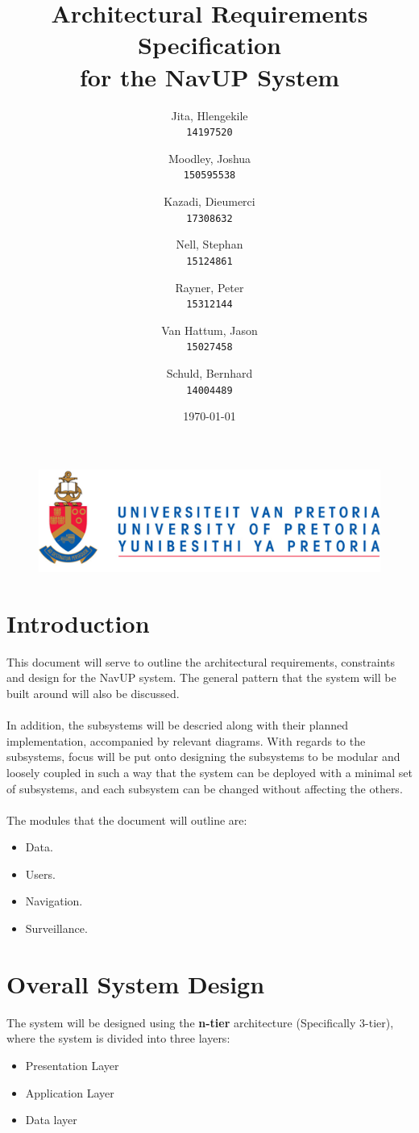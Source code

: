\documentclass[english]{article}
\author{
	Jita, Hlengekile\\
	\texttt{14197520}
	\and
	Moodley, Joshua\\
	\texttt{150595538}
	\and
	Kazadi, Dieumerci\\
	\texttt{17308632}
	\and
	Nell, Stephan\\
	\texttt{15124861}
	\and
	Rayner, Peter\\
	\texttt{15312144}
	\and
	Van Hattum, Jason\\
	\texttt{15027458}
	\and
	Schuld, Bernhard\\
	\texttt{14004489}
}
\title{Architectural Requirements Specification\\
	for the NavUP System\\
	}
\date{\today}
\begin{document}
    \fboxsep=2mm

	\maketitle
	\begin{figure}[!t]
		\includegraphics{up_logo.png}
	\end{figure}
	\newpage

	\tableofcontents
	\newpage

	

	\section{Introduction}

		This document will serve to outline the architectural requirements, constraints and design for the NavUP system. The general pattern that the system will be built around will also be discussed.\\
        \\
		In addition, the subsystems will be descried along with their planned implementation, accompanied by relevant diagrams. With regards to the subsystems, focus will be put onto designing the subsystems to be modular and loosely coupled in such a way that the system can be deployed with a minimal set of subsystems, and each subsystem can be changed without affecting the others.\\
		\\		
		The modules that the document will outline are:
		\begin{itemize}
		    \item Data.
		    \item Users.
		    \item Navigation.
		    \item Surveillance.
		\end{itemize}
		
	\section{Overall System Design}
	    The system will be designed using the \textbf{n-tier} architecture (Specifically 3-tier), where the system is divided into three layers:
	    \begin{itemize}
	        \item Presentation Layer
	        \item Application Layer
	        \item Data layer
	    \end{itemize}
	    
\end{document}
